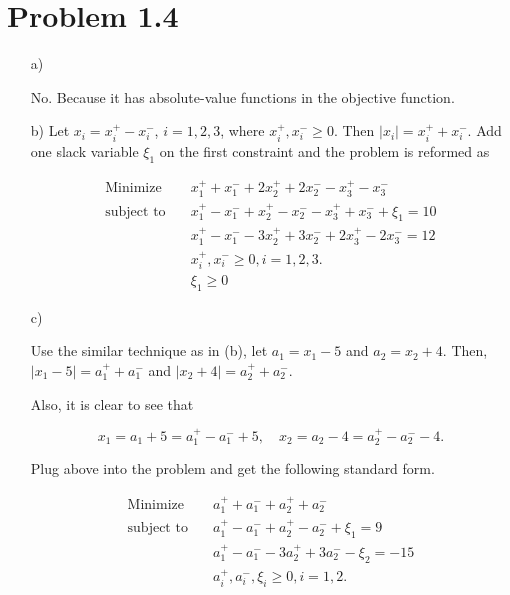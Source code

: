 \documentclass[12pt]{article}
\begin{document}
\section*{Problem 1.4}
\begin{enumerate}
\item[a)]

No. Because it has absolute-value functions in the objective function.

\item[b)]
Let $x_i = x_i^+ - x_i^-$, $i = 1, 2, 3$, where $x_i^+, x_i^- \geqslant 0$. Then $|x_i| = x_i^+ + x_i^-$. Add one slack variable $\xi_1$ on the first constraint and the problem is reformed as

\begin{equation*}
\begin{aligned}
\text{Minimize} \quad & x_1^+ + x_1^- + 2x_2^+ + 2x_2^- - x_3^+ - x_3^- \\
\text{subject\  to} \quad & x_1^+ - x_1^- + x_2^+ - x_2^- - x_3^+ + x_3^- + \xi_1 = 10 \\
& x_1^+ - x_1^- - 3x_2^+ + 3x_2^- + 2x_3^+ - 2x_3^- = 12 \\
& x_i^+, x_i^- \geqslant 0, i = 1, 2, 3. \\
& \xi_1 \geqslant 0
\end{aligned}
\end{equation*}

\item[c)]

Use the similar technique as in (b), let $a_1 = x_1 - 5$ and $a_2 = x_2 + 4$. Then, $|x_1 - 5| = a_1^+ + a_1^-$ and $ |x_2 + 4| = a_2^+ + a_2^-$. 

Also, it is clear to see that

$$
x_1 = a_1 + 5 = a_1^+ - a_1^- + 5, \quad x_2 = a_2 - 4 = a_2^+ - a_2^- - 4.
$$

Plug above into the problem and get the following standard form.

\begin{equation*}
\begin{aligned}
\text{Minimize} \quad & a_1^+ + a_1^- + a_2^+ + a_2^- \\
\text{subject\  to} \quad & a_1^+ - a_1^- + a_2^+ - a_2^- + \xi_1 = 9 \\
& a_1^+ - a_1^- - 3a_2^+ + 3a_2^- - \xi_2 = -15 \\
& a_i^+, a_i^-, \xi_i \geqslant 0, i = 1, 2. 
\end{aligned}
\end{equation*}
\end{enumerate}
\end{document}
